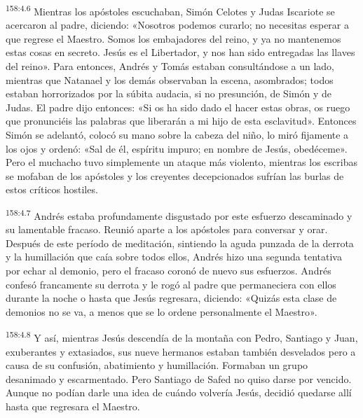 \par 
\textsuperscript{158:4.6} Mientras los apóstoles escuchaban, Simón Celotes y Judas Iscariote se acercaron al padre, diciendo: «Nosotros podemos curarlo; no necesitas esperar a que regrese el Maestro. Somos los embajadores del reino, y ya no mantenemos estas cosas en secreto. Jesús es el Libertador, y nos han sido entregadas las llaves del reino». Para entonces, Andrés y Tomás estaban consultándose a un lado, mientras que Natanael y los demás observaban la escena, asombrados; todos estaban horrorizados por la súbita audacia, si no presunción, de Simón y de Judas. El padre dijo entonces: «Si os ha sido dado el hacer estas obras, os ruego que pronunciéis las palabras que liberarán a mi hijo de esta esclavitud». Entonces Simón se adelantó, colocó su mano sobre la cabeza del niño, lo miró fijamente a los ojos y ordenó: «Sal de él, espíritu impuro; en nombre de Jesús, obedéceme». Pero el muchacho tuvo simplemente un ataque más violento, mientras los escribas se mofaban de los apóstoles y los creyentes decepcionados sufrían las burlas de estos críticos hostiles.

\par 
\textsuperscript{158:4.7} Andrés estaba profundamente disgustado por este esfuerzo descaminado y su lamentable fracaso. Reunió aparte a los apóstoles para conversar y orar. Después de este período de meditación, sintiendo la aguda punzada de la derrota y la humillación que caía sobre todos ellos, Andrés hizo una segunda tentativa por echar al demonio, pero el fracaso coronó de nuevo sus esfuerzos. Andrés confesó francamente su derrota y le rogó al padre que permaneciera con ellos durante la noche o hasta que Jesús regresara, diciendo: «Quizás esta clase de demonios no se va, a menos que se lo ordene personalmente el Maestro».

\par 
\textsuperscript{158:4.8} Y así, mientras Jesús descendía de la montaña con Pedro, Santiago y Juan, exuberantes y extasiados, sus nueve hermanos estaban también desvelados pero a causa de su confusión, abatimiento y humillación. Formaban un grupo desanimado y escarmentado. Pero Santiago de Safed no quiso darse por vencido. Aunque no podían darle una idea de cuándo volvería Jesús, decidió quedarse allí hasta que regresara el Maestro.

